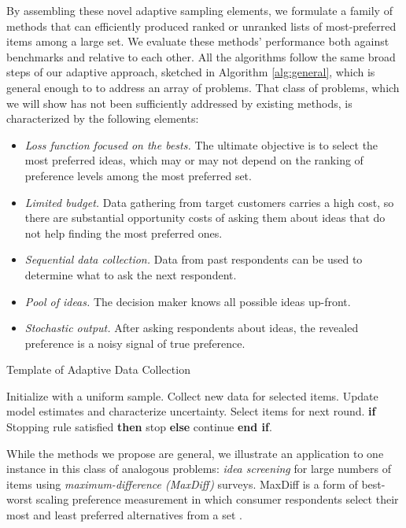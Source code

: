 \documentclass[blindrev]{informs3} %
\begin{document}
By assembling these novel adaptive sampling elements, we formulate a family of methods that can efficiently produced ranked or unranked lists of most-preferred items among a large set. We evaluate these methods' performance both against benchmarks and relative to each other. All the algorithms follow the same broad steps of our adaptive approach, sketched in Algorithm \ref{alg:general}, which is general enough to to address an array of problems. That class of problems, which we will show has not been sufficiently addressed by existing methods, is characterized by the following elements:

\begin{itemize}
\item \emph{Loss function focused on the bests.} The ultimate objective is to select the most preferred ideas, which may or may not depend on the ranking of preference levels among the most preferred set.
\item \emph{Limited budget.} Data gathering from target customers carries a high cost, so there are substantial opportunity costs of asking them about ideas that do not help finding the most preferred ones.
\item \emph{Sequential data collection.} Data from past respondents can be used to determine what to ask the next respondent.
\item \emph{Pool of ideas.} The decision maker knows all possible ideas up-front.
\item \emph{Stochastic output.} After asking respondents about ideas, the revealed preference is a noisy signal of true preference.
\end{itemize}

\begin{algorithm} 
\caption{Template of Adaptive Data Collection} \label{alg:general}
\begin{algorithmic}[1]
\State Initialize with a uniform sample.
\State Collect new data for selected items.
\State Update model estimates and characterize uncertainty.
\State Select items for next round.
\State \textbf{if} {Stopping rule satisfied} \textbf{then} stop \textbf{else} continue \textbf{end if}.
\EndFor
\end{algorithmic}
\end{algorithm}

While the methods we propose are general, we illustrate an application to one instance in this class of analogous problems: \emph{idea screening} for large numbers of items using \emph{maximum-difference (MaxDiff)} surveys. MaxDiff is a form of best-worst scaling preference measurement in which consumer respondents select their most and least preferred alternatives from a set \citep{marley2005some}. 
\end{document}
